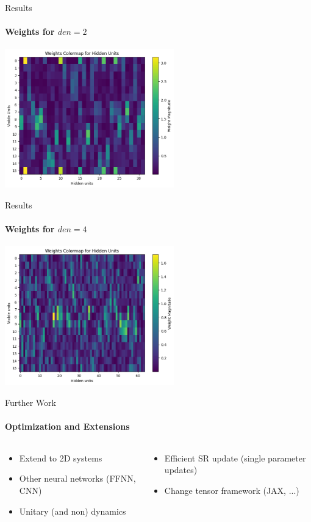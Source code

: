 \documentclass{beamer}
\begin{document}
\begin{frame}{Results}
\framesubtitle{Weights for $den = 2$}
\begin{center}
\includegraphics[height=6cm]{images/16spin_den2_jm1.png}
\end{center}
\end{frame}

\begin{frame}{Results}
\framesubtitle{Weights for $den = 4$}
\begin{center}
\includegraphics[height=6cm]{images/16spin_den4_jm1.png}
\end{center}
\end{frame}

\begin{frame}{Further Work}
\framesubtitle{Optimization and Extensions}
\begin{columns}
\begin{column}{0.5\textwidth}
\begin{itemize}
	\item Extend to 2D systems
	\item Other neural networks (FFNN, CNN)
	\item Unitary (and non) dynamics
\end{itemize}
\end{column}
\begin{column}{0.5\textwidth}
\begin{itemize}
	\item Efficient SR update (single parameter updates)
	\item Change tensor framework (JAX, ...)
\end{itemize}
\end{column}
\end{columns}
\end{frame}
\end{document}
